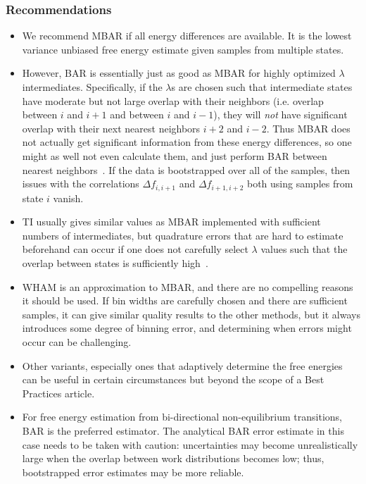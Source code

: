 \subsubsection{Recommendations}
\begin{itemize}
\item We recommend MBAR if all energy differences are available. It is the lowest variance unbiased free energy estimate given samples from multiple states.
\item However, BAR is essentially just as good as MBAR for highly optimized $\lambda$ intermediates. Specifically, if the $\lambda$s are chosen such that intermediate states have moderate but not large overlap with their neighbors (i.e. overlap between $i$ and $i+1$ and between $i$ and $i-1$), they will \textit{not} have significant overlap with their next nearest neighbors $i+2$ and $i-2$. Thus MBAR does not actually get significant information from these energy differences, so one might as well not even calculate them, and just perform BAR between nearest neighbors~\cite{paliwal2011benchmark}.  If the data is bootstrapped over all of the samples, then issues with the correlations $\Delta f_{i,i+1}$ and $\Delta f_{i+1,i+2}$ both using samples from state $i$ vanish.
\item TI usually gives similar values as MBAR implemented with sufficient numbers of intermediates, but quadrature errors that are hard to estimate beforehand  can occur if one does not carefully select $\lambda$ values such that the overlap between states is sufficiently high~\cite{paliwal2011benchmark}.
\item WHAM is an approximation to MBAR, and there are no compelling reasons it should be used. If bin widths are carefully chosen and there are sufficient samples, it can give similar quality results to the other methods, but it always introduces some degree of binning error, and determining when errors might occur can be challenging. 
\item Other variants, especially ones that adaptively determine the free energies can be useful in certain circumstances but beyond the scope of a Best Practices article.
\item For free energy estimation from bi-directional non-equilibrium transitions, BAR is the preferred estimator. The analytical BAR error estimate in this case needs to be taken with caution: uncertainties may become unrealistically large when the overlap between work distributions becomes low; thus, bootstrapped error estimates may be more reliable. 
\end{itemize}


